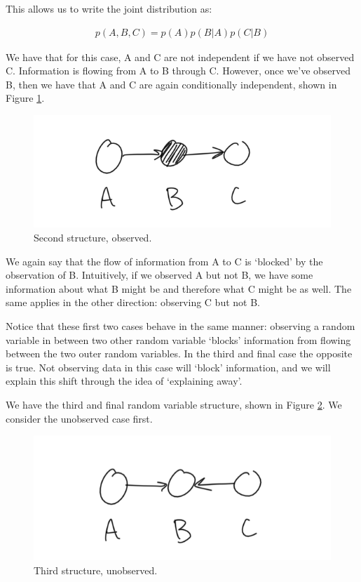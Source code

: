 This allows us to write the joint distribution as:

\begin{align*}
	p(A, B, C) = p(A) p(B | A) p(C | B)
\end{align*}

We have that for this case, A and C are not independent if we have not observed C. Information is flowing from A to B through C. However, once we've observed B, then we have that A and C are again conditionally independent, shown in Figure \ref{fig:second-case-observed}.

\begin{figure}
	\centering
	\includegraphics[width=0.5\paperwidth]{../GraphicalModels/fig/second-case-observed.png}
	\caption{Second structure, observed.}
	\label{fig:second-case-observed}
\end{figure}

We again say that the flow of information from A to C is `blocked' by the observation of B. Intuitively, if we observed A but not B, we have some information about what B might be and therefore what C might be as well.  The same applies in the other direction: observing C but not B.

Notice that these first two cases behave in the same manner: observing a random variable in between two other random variable `blocks' information from flowing between the two outer random variables. In the third and final case the opposite is true. Not observing data in this case will `block' information, and we will explain this shift through the idea of `explaining away'.

We have the third and final random variable structure, shown in Figure \ref{fig:third-case-unobserved}. We consider the unobserved case first.
\begin{figure}
	\centering
	\includegraphics[width=0.5\paperwidth]{../GraphicalModels/fig/third-case-unobserved.png}
	\caption{Third structure, unobserved.}
	\label{fig:third-case-unobserved}
\end{figure}

